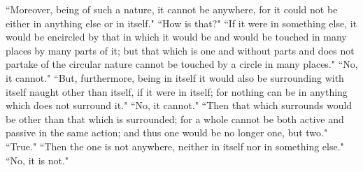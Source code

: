 \documentclass[letterpaper,12pt]{article}
\newcommand{\stephpag}[1]{\marginnote{\small\itshape\fontfamily{ppl}\selectfont #1}}
\begin{document}
``Moreover, being of such a nature, it cannot be anywhere, for it could not be either in anything else or in itself." ``How is that?" ``If it were in something else, it would be encircled by that in which it would be and would be touched in many places by many parts of it; but that which is one and without parts and does not partake of the circular nature cannot be touched by a circle in many places." ``No, it cannot." ``But, furthermore, being in itself it would also be surrounding with itself naught other than itself, \stephpag{b} if it were in itself; for nothing can be in anything which does not surround it." ``No, it cannot." ``Then that which surrounds would be other than that which is surrounded; for a whole cannot be both active and passive in the same action; and thus one would be no longer one, but two." ``True." ``Then the one is not anywhere, neither in itself nor in something else." ``No, it is not."
\end{document}

